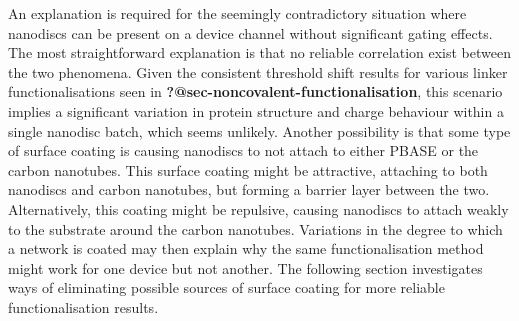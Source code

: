 \documentclass[
  a4paper,
]{scrbook}
\begin{document}
An explanation is required for the seemingly contradictory situation
where nanodiscs can be present on a device channel without significant
gating effects. The most straightforward explanation is that no reliable
correlation exist between the two phenomena. Given the consistent
threshold shift results for various linker functionalisations seen in
\textbf{?@sec-noncovalent-functionalisation}, this scenario implies a
significant variation in protein structure and charge behaviour within a
single nanodisc batch, which seems unlikely. Another possibility is that
some type of surface coating is causing nanodiscs to not attach to
either PBASE or the carbon nanotubes. This surface coating might be
attractive, attaching to both nanodiscs and carbon nanotubes, but
forming a barrier layer between the two. Alternatively, this coating
might be repulsive, causing nanodiscs to attach weakly to the substrate
around the carbon nanotubes. Variations in the degree to which a network
is coated may then explain why the same functionalisation method might
work for one device but not another. The following section investigates
ways of eliminating possible sources of surface coating for more
reliable functionalisation results.
\end{document}
